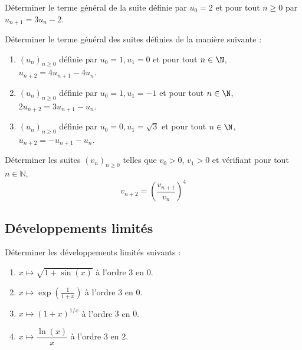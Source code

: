 \documentclass[a4paper,twoside,french,11pt]{VcCours}
\begin{document}
\begin{Exercice} Déterminer le terme général de la suite définie par $u_0=2$ et pour tout $n \geq 0$ par $u_{n+1}=3u_n-2$.
\end{Exercice} 



\begin{Exercice} Déterminer le terme général des suites définies de la manière suivante :
    \begin{enumerate}
      \item
        $(u_n)_{n \geq 0}$ définie par $u_0 = 1,u_1 = 0$ et pour tout $n \in \N$, $u_{n + 2} = 4u_{n + 1} - 4u_n$.
      \item
        $(u_n)_{n \geq 0}$ définie par $u_0 = 1,u_1 = - 1$ et pour tout $n \in \N$, $2u_{n + 2} = 3u_{n + 1} - u_n$.
        \item
        $(u_n)_{n \geq 0}$ définie par $u_0 = 0,u_1 = \sqrt{3}$ et pour tout $n \in \N$, $u_{n + 2} = -u_{n+1}- u_n$.

    \end{enumerate}
\end{Exercice}    


\begin{Exercice} Déterminer les suites $(v_n)_{n \geq 0}$ telles que $v_0>0$, $v_1>0$  et vérifiant pour tout $n \in \mathbb{N}$, 
$$v_{n+2}=\left(\dfrac{v_{n+1}}{v_n}\right)^4$$
\end{Exercice}


\subsection{Développements limités}

\begin{Exercice}
Déterminer les développements limités suivants :

\begin{multicols}{2}
\begin{enumerate}
\item $x \mapsto \sqrt{1+\sin(x)}$ à l'ordre $3$ en $0$.
\item $x \mapsto \exp \left( \frac{1}{1+x}\right)$ à l'ordre $3$ en $0$.
\item $x \mapsto (1+x)^{1/x}$ à l'ordre $3$ en $0$.
\item $x \mapsto \dfrac{\ln(x)}{x}$ à l'ordre $3$ en $2$.
\end{enumerate}
\end{multicols}
\end{Exercice} 
 
\end{document}
